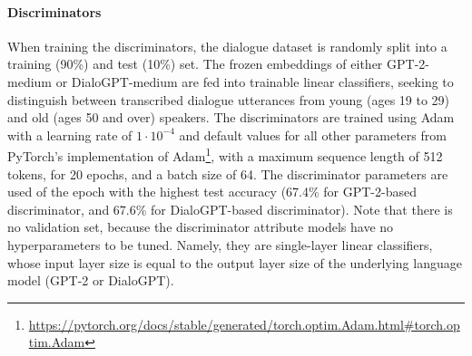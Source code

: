 \paragraph{Discriminators} When training the discriminators, the dialogue dataset is randomly split into a training (90\%) and test (10\%) set. The frozen embeddings of either GPT-2-medium \citep{radford2019language} or DialoGPT-medium \citep{zhang2019dialogpt} are fed into trainable linear classifiers, seeking to distinguish between transcribed dialogue utterances from young (ages 19 to 29) and old (ages 50 and over) speakers. The discriminators are trained using Adam \citep{DBLP:journals/corr/KingmaB14} with a learning rate of $1\cdot10^{-4}$ 
and default values for all other parameters from PyTorch's implementation of Adam\footnote{\url{https://pytorch.org/docs/stable/generated/torch.optim.Adam.html\#torch.optim.Adam}}, 
with a maximum sequence length of 512 tokens, for 20 epochs, and a batch size of 64. The discriminator parameters are used of the epoch with the highest test accuracy (67.4\% for GPT-2-based discriminator, and 67.6\% for DialoGPT-based discriminator). Note that there is no validation set, because the discriminator attribute models have no hyperparameters to be tuned. Namely, they are single-layer linear classifiers, whose input layer size is equal to the output layer size of the underlying language model (GPT-2 or DialoGPT). 




